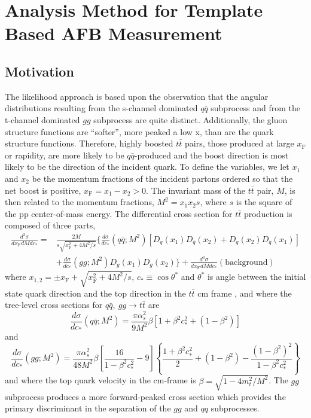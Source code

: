 \section{Analysis Method for Template Based AFB Measurement}  %
\subsection{Motivation}

The likelihood approach is based upon the observation that the angular distributions resulting from the s-channel dominated $q\bar q$ subprocess and from the t-channel dominated $gg$ subprocess are quite distinct.  Additionally, the gluon structure functions are ``softer'', more peaked a low x, than are the quark structure functions.  Therefore, highly boosted $t\bar t$ pairs, those produced at large $x_\mathrm{F}$ or rapidity, are more likely to be $q\bar q$-produced and the boost direction is most likely to be the direction of the incident quark.  To define the variables, we let $x_1$ and $x_2$ be the momentum fractions of the incident partons ordered so that the net boost is positive, $x_\mathrm{F}=x_1-x_2>0$.  The invariant mass of the $t\bar t$ pair, $M$, is then related to the momentum fractions, $M^2 = x_1x_2s$, where $s$ is the square of the pp center-of-mass energy. The differential cross section for $t\bar t$ production is composed of three parts,
\begin{align}
\frac{d^3\sigma}{dx_\mathrm{F}dMdc_*} =&\frac{2M}{s\sqrt{x_\mathrm{F}^2+4M^2/s}}\biggl\lbrace\frac{d\sigma}{dc_*}(q\bar q;M^2)\left[D_q(x_1)D_{\bar q}(x_2)+D_q(x_2)D_{\bar q}(x_1)\right] \nonumber \\ &+ \frac{d\sigma}{dc_*}(gg;M^2)D_g(x_1)D_g(x_2)\biggr\rbrace + \frac{d^3\sigma}{dx_\mathrm{F}dMdc_*}(\mathrm{background})
\label{eq:totxsdef}
\end{align}
where $x_{1,2}=\pm x_\mathrm{F}+ \sqrt{x_\mathrm{F}^2+4M^2/s}$, $c_*\equiv\cos{\theta^*}$ and $\theta^*$ is angle between the initial state quark direction and the top direction in the $t\bar t$ cm frame , and where the tree-level cross sections for $q\bar q,\ gg \to t\bar t$ are
\begin{equation}
\frac{d\sigma}{dc_*}(q\bar q;M^2) = \frac{\pi\alpha_s^2}{9M^2}\beta\left[1+\beta^2c_*^2+\left(1-\beta^2\right)\right]
\label{eq:qqzerodef}
\end{equation}
and
\begin{equation}
\frac{d\sigma}{dc_*}(gg;M^2) = \frac{\pi\alpha_s^2}{48M^2}\beta\left[\frac{16}{1-\beta^2c_*^2}-9\right]\left\lbrace\frac{1+\beta^2c_*^2}{2}+(1-\beta^2)-\frac{(1-\beta^2)^2}{1-\beta^2c_*^2}\right\rbrace
\label{eq:ggdef}
\end{equation}
and where the top quark velocity in the cm-frame is $\beta=\sqrt{1-4m_t^2/M^2}$.  The $gg$ subprocess produces a more forward-peaked cross section which provides the primary discriminant in the separation of the $gg$ and $qq$ subprocesses.

